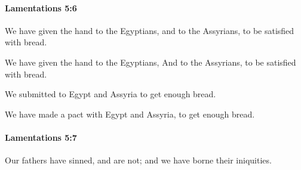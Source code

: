 		\paragraph{Lamentations 5:6} %
			\label{LAMENTATIONS-5-6}

			We have given the hand to the Egyptians, and to the Assyrians, to be satisfied with bread.

			\begin{versebox}
					\item[BHS] 
					\item[LXX] 
					\item[ASV] We have given the hand to the Egyptians, And to the Assyrians, to be satisfied with bread.
					\item[NIV] We submitted to Egypt and Assyria to get enough bread.
					\item[NRSV] We have made a pact with Egypt and Assyria, to get enough bread.
			\end{versebox}

		\paragraph{Lamentations 5:7} %
			\label{LAMENTATIONS-5-7}

			Our fathers have sinned, and are not; and we have borne their iniquities.

